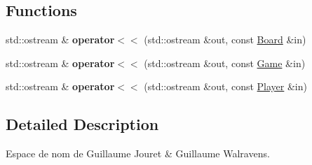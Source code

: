 \subsection*{Functions}
\begin{DoxyCompactItemize}
\item 
\hypertarget{namespace_g_j___g_w_acd223b01543d5d5fe2d3ae15cd908bd9}{}\label{namespace_g_j___g_w_acd223b01543d5d5fe2d3ae15cd908bd9} 
std\+::ostream \& {\bfseries operator$<$$<$} (std\+::ostream \&out, const \hyperlink{class_g_j___g_w_1_1_board}{Board} \&in)
\item 
\hypertarget{namespace_g_j___g_w_a81b49299d3d364d4308258c2f250cc54}{}\label{namespace_g_j___g_w_a81b49299d3d364d4308258c2f250cc54} 
std\+::ostream \& {\bfseries operator$<$$<$} (std\+::ostream \&out, const \hyperlink{class_g_j___g_w_1_1_game}{Game} \&in)
\item 
\hypertarget{namespace_g_j___g_w_afcf0bedeefbc852b3ec7d91fd6ac1f35}{}\label{namespace_g_j___g_w_afcf0bedeefbc852b3ec7d91fd6ac1f35} 
std\+::ostream \& {\bfseries operator$<$$<$} (std\+::ostream \&out, const \hyperlink{class_g_j___g_w_1_1_player}{Player} \&in)
\end{DoxyCompactItemize}


\subsection{Detailed Description}
Espace de nom de Guillaume Jouret \& Guillaume Walravens. 